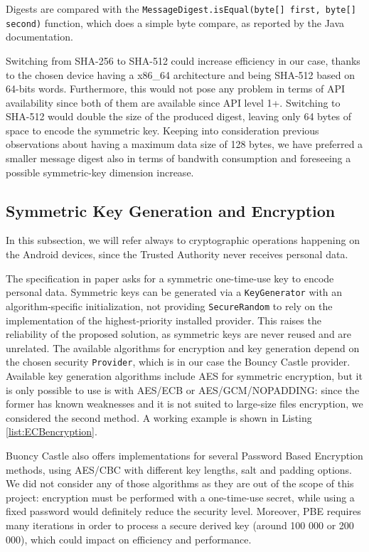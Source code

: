 

Digests are compared with the \texttt{MessageDigest.isEqual(byte[] first, byte[] second)} function, which does a simple byte compare, as reported by the Java documentation.

Switching from SHA-256 to SHA-512 could increase efficiency in our case, thanks to the chosen device having a x86\_64 architecture and being SHA-512 based on 64-bits words.  Furthermore, this would not pose any problem in terms of API availability since both of them are available since API level 1+. Switching to SHA-512 would double the size of the produced digest, leaving only 64 bytes of space to encode the symmetric key. Keeping into consideration previous observations about having a maximum data size of 128 bytes, we have preferred a smaller message digest also in terms of bandwith consumption and foreseeing a possible symmetric-key dimension increase.

\subsection{Symmetric Key Generation and Encryption}
In this subsection, we will refer always to cryptographic operations happening on the Android devices, since the Trusted Authority never receives personal data.

The specification in paper \cite{mont2003towards} asks for a symmetric one-time-use key to encode personal data. Symmetric keys can be generated via a \texttt{KeyGenerator} with an algorithm-specific initialization, not providing \texttt{SecureRandom} to rely on the implementation of the highest-priority installed provider. This raises the reliability of the proposed solution, as symmetric keys are never reused and are unrelated. The available algorithms for encryption and key generation depend on the chosen security \texttt{Provider}, which is in our case the Bouncy Castle provider. Available key generation algorithms include AES for symmetric encryption, but it is only possible to use is with AES/ECB or AES/GCM/NOPADDING: since the former has known weaknesses and it is not suited to large-size files encryption, we considered the second method. A working example is shown in Listing \ref{list:ECBencryption}.

Buoncy Castle also offers implementations for several Password Based Encryption methods, using AES/CBC with different key lengths, salt and padding options. We did not consider any of those algorithms as they are out of the scope of this project: encryption must be performed with a one-time-use secret, while using a fixed password would definitely reduce the security level. Moreover, PBE requires many iterations in order to process a secure derived key (around 100 000 or 200 000), which could impact on efficiency and performance.

